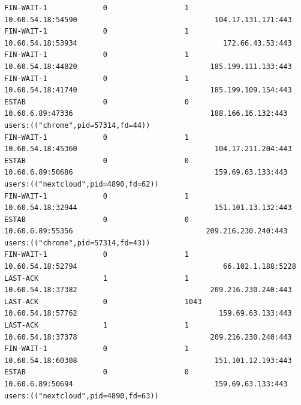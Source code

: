 \begin{verbatim}
FIN-WAIT-1             0                  1                                                           10.60.54.18:54590                                104.17.131.171:443
FIN-WAIT-1             0                  1                                                           10.60.54.18:53934                                  172.66.43.53:443
FIN-WAIT-1             0                  1                                                           10.60.54.18:44820                               185.199.111.133:443
FIN-WAIT-1             0                  1                                                           10.60.54.18:41740                               185.199.109.154:443
ESTAB                  0                  0                                                            10.60.6.89:47336                                188.166.16.132:443               users:(("chrome",pid=57314,fd=44))
FIN-WAIT-1             0                  1                                                           10.60.54.18:45360                                104.17.211.204:443
ESTAB                  0                  0                                                            10.60.6.89:50686                                 159.69.63.133:443               users:(("nextcloud",pid=4890,fd=62))
FIN-WAIT-1             0                  1                                                           10.60.54.18:32944                                151.101.13.132:443
ESTAB                  0                  0                                                            10.60.6.89:55356                               209.216.230.240:443               users:(("chrome",pid=57314,fd=43))
FIN-WAIT-1             0                  1                                                           10.60.54.18:52794                                  66.102.1.188:5228
LAST-ACK               1                  1                                                           10.60.54.18:37382                               209.216.230.240:443
LAST-ACK               0                  1043                                                        10.60.54.18:57762                                 159.69.63.133:443
LAST-ACK               1                  1                                                           10.60.54.18:37378                               209.216.230.240:443
FIN-WAIT-1             0                  1                                                           10.60.54.18:60308                                151.101.12.193:443
ESTAB                  0                  0                                                            10.60.6.89:50694                                 159.69.63.133:443               users:(("nextcloud",pid=4890,fd=63))

\end{verbatim}
